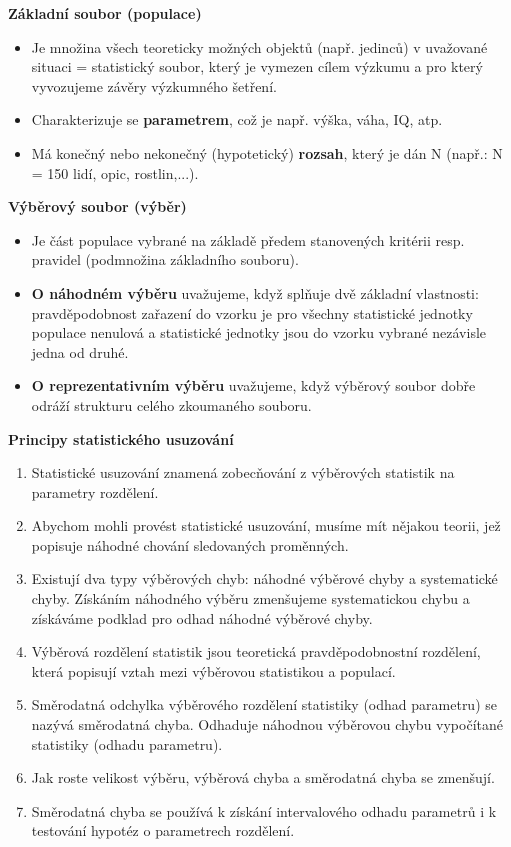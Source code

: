 \textbf{Základní soubor (populace)}
\begin{itemize}
	\item Je množina všech teoreticky možných objektů (např. jedinců) v uvažované situaci = statistický soubor, který je vymezen cílem výzkumu a pro který vyvozujeme závěry výzkumného šetření.
	\item Charakterizuje se \textbf{parametrem}, což je např. výška, váha, IQ, atp.
	\item Má konečný nebo nekonečný (hypotetický) \textbf{rozsah}, který je dán N (např.: N = 150 lidí, opic, rostlin,...).
\end{itemize}
\textbf{Výběrový soubor (výběr)}
\begin{itemize}
	\item Je část populace vybrané na základě předem stanovených kritérii resp. pravidel (podmnožina základního souboru).
	\item \textbf{O náhodném výběru} uvažujeme, když splňuje dvě základní vlastnosti: pravděpodobnost zařazení do vzorku je pro všechny statistické jednotky populace nenulová a statistické jednotky jsou do vzorku vybrané nezávisle jedna od druhé.
	\item \textbf{O reprezentativním výběru} uvažujeme, když výběrový soubor dobře odráží strukturu celého zkoumaného souboru.
\end{itemize}
\textbf{Principy statistického usuzování}
\begin{enumerate}
	\item Statistické usuzování znamená zobecňování z výběrových statistik na parametry rozdělení.
	\item Abychom mohli provést statistické usuzování, musíme mít nějakou teorii, jež popisuje náhodné chování sledovaných proměnných.
	\item Existují dva typy výběrových chyb: náhodné výběrové chyby a systematické chyby. Získáním náhodného výběru zmenšujeme systematickou chybu a získáváme podklad pro odhad náhodné výběrové chyby.
	\item Výběrová rozdělení statistik jsou teoretická pravděpodobnostní rozdělení, která popisují vztah mezi výběrovou statistikou a populací.
	\item Směrodatná odchylka výběrového rozdělení statistiky (odhad parametru) se nazývá směrodatná chyba. Odhaduje náhodnou výběrovou chybu vypočítané statistiky (odhadu parametru).
	\item Jak roste velikost výběru, výběrová chyba a směrodatná chyba se zmenšují.
	\item Směrodatná chyba se používá k získání intervalového odhadu parametrů i k testování hypotéz o parametrech rozdělení.
\end{enumerate}


